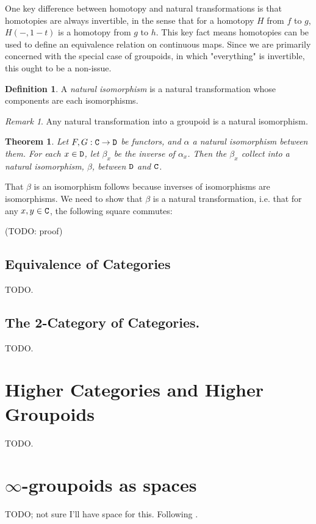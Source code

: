 \documentclass[11 pt]{amsart}
\theoremstyle{plain}   %
\newtheorem{thm}{Theorem}[section] %
\theoremstyle{definition}
\newtheorem{defn}{Definition}[section]
\theoremstyle{remark}
\newtheorem{rem}{Remark}[section]
\numberwithin{equation}{section}
\newcommand{\cat}[1]{{\normalfont\texttt{#1}}}
\begin{document}
One key difference between homotopy and natural transformations is that
homotopies are always invertible, in the sense that for a homotopy $H$ from $f$
to $g$, $H(-, 1-t)$ is a homotopy from $g$ to $h$. This key fact means
homotopies can be used to define an equivalence relation on continuous maps.
Since we are primarily concerned with the special case of groupoids, in which
"everything" is invertible, this ought to be a non-issue.

\begin{defn}
	A \emph{natural isomorphism} is a natural transformation whose components are
	each isomorphisms.
\end{defn}

\begin{rem}
	Any natural transformation into a groupoid is a natural isomorphism.
\end{rem}

\begin{thm}\label{natural isomorphisms are invertible}
	Let $F,G: \cat{C}\rightarrow\cat{D}$ be functors, and $\alpha$ a natural
	isomorphism between them. For each $x\in\cat{D}$, let $\beta_x$ be the
	inverse of $\alpha_x$. Then the $\beta_x$ collect into a natural
	isomorphism, $\beta$, between $\cat{D}$ and $\cat{C}$.
\end{thm}

That $\beta$ is an isomorphism follows because inverses of isomorphisms are
isomorphisms. We need to show that $\beta$ is a natural transformation, i.e.
that for any $x, y\in\cat{C}$, the following square commutes:

\begin{figure}[H]
	\centering
\end{figure}

(TODO: proof)

\subsection{Equivalence of Categories}

TODO.

\subsection{The 2-Category of Categories.}\label{1cat}

TODO.

\section{Higher Categories and Higher Groupoids}\label{higher categories}

TODO.

\section{$\infty$-groupoids as spaces}\label{infinity groupoids}

TODO; not sure I'll have space for this. Following \cite{Porter}.



\end{document}
